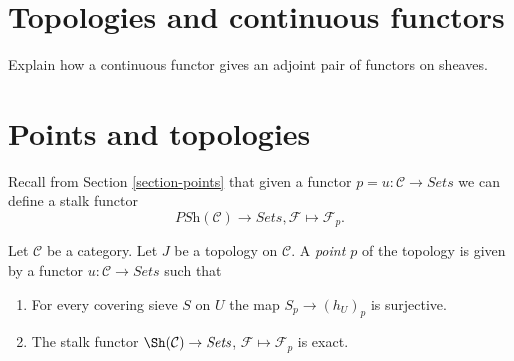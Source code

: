 \section{Topologies and continuous functors}
\label{section-topologies-continuous-functors}

\noindent
Explain how a continuous functor gives an adjoint
pair of functors on sheaves.





\section{Points and topologies}
\label{section-points-topologies}

\noindent
Recall from Section \ref{section-points} that given a functor
$p = u : \mathcal{C} \to \textit{Sets}$ we can define
a stalk functor
$$
\textit{PSh}(\mathcal{C}) \longrightarrow \textit{Sets},
\mathcal{F} \longmapsto \mathcal{F}_p.
$$

\begin{definition}
\label{definition-point-topology}
Let $\mathcal{C}$ be a category.
Let $J$ be a topology on $\mathcal{C}$.
A {\it point $p$} of the topology is given by a functor
$u : \mathcal{C} \to \textit{Sets}$ such that
\begin{enumerate}
\item For every covering sieve $S$ on $U$ the map
$S_p \to (h_U)_p$ is surjective.
\item The stalk functor $\Sh(\mathcal{C}) \to \textit{Sets}$,
$\mathcal{F} \mapsto \mathcal{F}_p$ is exact.
\end{enumerate}
\end{definition}


















